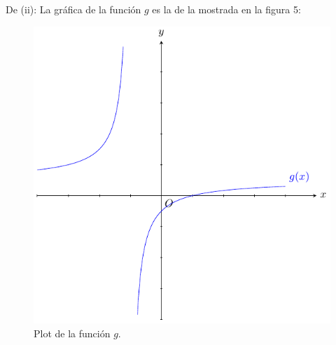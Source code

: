 \documentclass[12pt]{article}
\begin{document}
\begin{enumerate}
\begin{sol}
        De (ii): La gráfica de la función $g$ es la de la mostrada en la figura 5:
        \begin{figure}
            \begin{center}
                \includegraphics[scale=1]{images/3_2_2.pdf}
            \end{center}
            \caption{Plot de la función $g$.}
        \end{figure}


\end{sol}
\end{enumerate}
\end{document}

